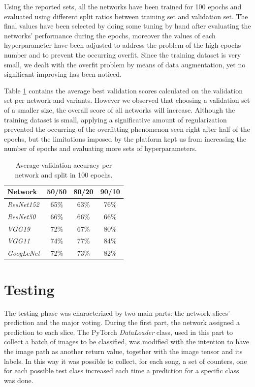 \documentclass[10pt,twocolumn,letterpaper]{article}
\begin{document}
Using the reported sets, all the networks have been trained for 100 epochs and evaluated using different split ratios between training set and validation set. The final values have been selected by doing some tuning by hand after evaluating the networks' performance during the epochs, moreover the values of each hyperparameter have been adjusted to address the problem of the high epochs number and to prevent the occurring overfit. Since the training dataset is very small, we dealt with the overfit problem by means of data augmentation, yet no significant improving has been noticed.

Table \ref{tab:val} contains the average best validation scores calculated on the validation set per network and variants. However we observed that choosing a validation set of a smaller size, the overall score of all networks will increase. Although the training dataset is small, applying a significative amount of regularization prevented the occurring of the overfitting phenomenon seen right after half of the epochs, but the limitations imposed by the platform kept us from increasing the number of epochs and evaluating more sets of hyperparameters. 

\begin{table}[ht]
   \begin{center}
   \def\arraystretch{1.5}
   \begin{tabular}{l|c|c|c}
      \textbf{Network} & \textbf{50/50} & \textbf{80/20} & \textbf{90/10} \\
   \hline
   \textit{ResNet152} & 65\% & 63\% & 76\% \\
   \hline
   \textit{ResNet50} & 66\% & 66\% & 66\% \\
   \hline
   \textit{VGG19} & 72\% & 67\% & 80\% \\
   \hline
   \textit{VGG11} & 74\% & 77\% & 84\% \\
   \hline
   \textit{GoogLeNet} & 72\% & 73\% & 82\% \\
   \end{tabular}
   \end{center}
   \caption{Average validation accuracy per network and split in 100 epochs.}
   \label{tab:val}
   \end{table}

\section{Testing}\label{testing}

The testing phase was characterized by two main parts: the network slices' prediction and the major voting.
During the first part, the network assigned a prediction to each slice. The PyTorch \textit{DataLoader} class, used in this part to collect a batch of images to be classified, was modified with the intention to have the image path as another return value, together with the image tensor and its labels. In this way it was possible to collect, for each song, a set of counters, one for each possible test class increased each time a prediction for a specific class was done.
\end{document}
